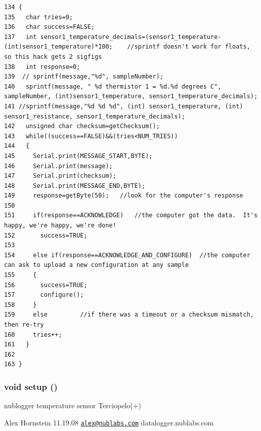 \begin{Code}\begin{verbatim}134 {
135   char tries=0;
136   char success=FALSE;
137   int sensor1_temperature_decimals=(sensor1_temperature-(int)sensor1_temperature)*100;    //sprintf doesn't work for floats, so this hack gets 2 sigfigs
138   int response=0;
139  // sprintf(message,"%d", sampleNumber);
140   sprintf(message, " %d thermistor 1 = %d.%d degrees C", sampleNumber, (int)sensor1_temperature, sensor1_temperature_decimals);
141 //sprintf(message,"%d %d %d", (int) sensor1_temperature, (int) sensor1_resistance, sensor1_temperature_decimals);
142   unsigned char checksum=getChecksum();
143   while((success==FALSE)&&(tries<NUM_TRIES))
144   {
145     Serial.print(MESSAGE_START,BYTE);
146     Serial.print(message);
147     Serial.print(checksum);
148     Serial.print(MESSAGE_END,BYTE);
149     response=getByte(50);   //look for the computer's response
150 
151     if(response==ACKNOWLEDGE)   //the computer got the data.  It's happy, we're happy, we're done!
152       success=TRUE;
153 
154     else if(response==ACKNOWLEDGE_AND_CONFIGURE)  //the computer can ask to upload a new configuration at any sample
155     {
156       success=TRUE;
157       configure();
158     }
159     else         //if there was a timeout or a checksum mismatch, then re-try
160     tries++;
161   }
162 
163 }
\end{verbatim}
\end{Code}


\hypertarget{temperature__sensor___terciopelo_8pde_4fc01d736fe50cf5b977f755b675f11d}{
\subsubsection[{setup}]{\setlength{\rightskip}{0pt plus 5cm}void setup ()}}
\label{temperature__sensor___terciopelo_8pde_4fc01d736fe50cf5b977f755b675f11d}


nublogger temperature sensor Terciopelo(+)

Alex Hornstein 11.19.08 \href{mailto:alex@nublabs.com}{\tt alex@nublabs.com} datalogger.nublabs.com

